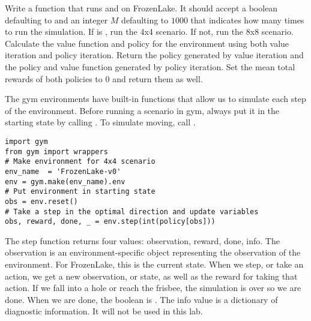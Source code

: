 \begin{problem}
\label{prob:policyiter-value5}
Write a function that runs  and  on FrozenLake.
It should accept a boolean  defaulting to  and an integer $M$ defaulting to $1000$ that indicates how many times to run the simulation.
If  is , run the 4x4 scenario.
If not, run the 8x8 scenario.
Calculate the value function and policy for the environment using both value iteration and policy iteration.
Return the policy generated by value iteration and the policy and value function generated by policy iteration.
Set the mean total rewards of both policies to $0$ and return them as well.
\end{problem}

The gym environments have built-in functions that allow us to simulate each step of the environment.
Before running a scenario in gym, always put it in the starting state by calling .
To simulate moving, call .

\begin{lstlisting}
import gym
from gym import wrappers
# Make environment for 4x4 scenario
env_name  = 'FrozenLake-v0'
env = gym.make(env_name).env
# Put environment in starting state
obs = env.reset()
# Take a step in the optimal direction and update variables
obs, reward, done, _ = env.step(int(policy[obs]))
\end{lstlisting}


The step function returns four values: observation, reward, done, info.
The observation is an environment-specific object representing the observation of the environment.
For FrozenLake, this is the current state.
When we step, or take an action, we get a new observation, or state, as well as the reward for taking that action.
If we fall into a hole or reach the frisbee, the simulation is over so we are done.
When we are done, the boolean  is .
The info value is a dictionary of diagnostic information.
It will not be used in this lab.

